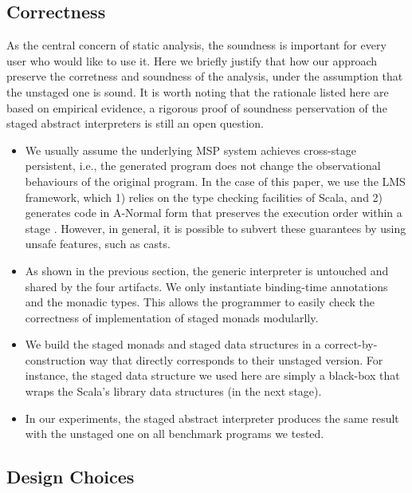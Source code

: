 
\subsection{Correctness}

As the central concern of static analysis, the soundness is important for
every user who would like to use it. Here we briefly justify that how our
approach preserve the corretness and soundness of the analysis, under the
assumption that the unstaged one is sound. It is worth noting that the rationale
listed here are based on empirical evidence, a rigorous proof of soundness
perservation of the staged abstract interpreters is still an open question.

\begin{itemize}
  \item We usually assume the underlying MSP system achieves cross-stage
    persistent, i.e., the generated program does not change the observational
    behaviours of the original program. In the case of this paper, we use the
    LMS framework, which 1) relies on the type checking facilities of Scala, and
    2) generates code in A-Normal form \cite{Flanagan:1993:ECC:155090.155113}
    that preserves the execution order within a stage \cite{DBLP:conf/birthday/Rompf16}.
    However, in general, it is possible to subvert these guarantees by
    using unsafe features, such as casts.
  \item As shown in the previous section, the generic interpreter is untouched
    and shared by the four artifacts. We only instantiate binding-time
    annotations and the monadic types. This allows the programmer to easily
    check the correctness of implementation of staged monads modularlly.
  \item We build the staged monads and staged data structures in a
    correct-by-construction way that directly corresponds to their unstaged
    version. For instance, the staged data structure we used here are simply
    a black-box that wraps the Scala's library data structures (in the next
    stage).
  \item In our experiments, the staged abstract interpreter produces the same
    result with the unstaged one on all benchmark programs we tested.
\end{itemize}

\subsection{Design Choices}

